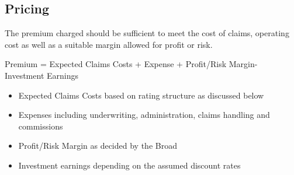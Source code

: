 \documentclass[12pt]{article}
\begin{document}
\subsection{Pricing}

\begin{flushleft}
The premium charged should be sufficient to meet the cost of claims, operating cost as well as a suitable margin allowed for profit or risk.\par \end{flushleft}
Premium = Expected Claims Costs + Expense + Profit/Risk Margin- Investment Earnings\par
\begin{itemize}
    \item Expected Claims Costs based on rating structure as discussed below
    \item Expenses including underwriting, administration, claims handling and commissions
    \item Profit/Risk Margin as decided by the Broad 
    \item Investment earnings depending on the assumed discount rates
\end{itemize}
\frameboxend
\end{document}
